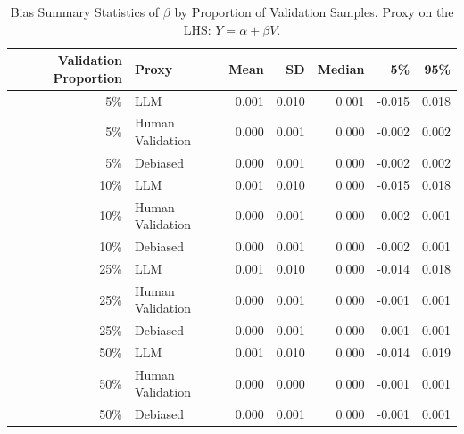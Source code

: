 \begin{table}

\caption{Bias Summary Statistics of $\beta$ by Proportion of Validation Samples. Proxy on the LHS: $Y = \alpha + \beta V$.}
\centering
\begin{tabular}[t]{rlrrrrr}
\toprule
Validation Proportion & Proxy & Mean & SD & Median & 5\% & 95\%\\
\midrule
5\% & LLM & 0.001 & 0.010 & 0.001 & -0.015 & 0.018\\
5\% & Human Validation & 0.000 & 0.001 & 0.000 & -0.002 & 0.002\\
5\% & Debiased & 0.000 & 0.001 & 0.000 & -0.002 & 0.002\\
10\% & LLM & 0.001 & 0.010 & 0.000 & -0.015 & 0.018\\
10\% & Human Validation & 0.000 & 0.001 & 0.000 & -0.002 & 0.001\\
10\% & Debiased & 0.000 & 0.001 & 0.000 & -0.002 & 0.001\\
25\% & LLM & 0.001 & 0.010 & 0.000 & -0.014 & 0.018\\
25\% & Human Validation & 0.000 & 0.001 & 0.000 & -0.001 & 0.001\\
25\% & Debiased & 0.000 & 0.001 & 0.000 & -0.001 & 0.001\\
50\% & LLM & 0.001 & 0.010 & 0.000 & -0.014 & 0.019\\
50\% & Human Validation & 0.000 & 0.000 & 0.000 & -0.001 & 0.001\\
50\% & Debiased & 0.000 & 0.001 & 0.000 & -0.001 & 0.001\\
\bottomrule
\end{tabular}
\end{table}

